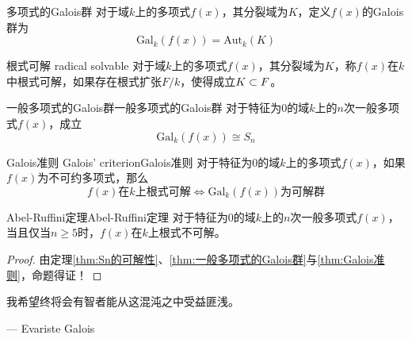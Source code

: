 \begin{definition}{多项式的Galois群}
	对于域$k$上的多项式$f(x)$，其分裂域为$K$，定义$f(x)$的Galois群为
	$$
	\text{Gal}_k(f(x))=\text{Aut}_k(K)
	$$
\end{definition}

\begin{definition}{根式可解 radical solvable}
	对于域$k$上的多项式$f(x)$，其分裂域为$K$，称$f(x)$在$k$中根式可解，如果存在根式扩张$F/k$，使得成立$K\subset F$。
\end{definition}

\begin{theorem}{一般多项式的Galois群}{一般多项式的Galois群}
	对于特征为$0$的域$k$上的$n$次一般多项式$f(x)$，成立%
	$$
	\text{Gal}_k(f(x))\cong S_n
	$$
\end{theorem}

\begin{theorem}{Galois准则 Galois' criterion}{Galois准则}
	对于特征为$0$的域$k$上的多项式$f(x)$，如果$f(x)$为不可约多项式，那么
	$$
	f(x)\text{在}k\text{上根式可解}\iff
	\text{Gal}_k(f(x))\text{为可解群}
	$$
\end{theorem}

\begin{theorem}{Abel-Ruffini定理}{Abel-Ruffini定理}
	对于特征为$0$的域$k$上的$n$次一般多项式$f(x)$，当且仅当$n\ge 5$时，$f(x)$在$k$上根式不可解。
\end{theorem}

\begin{proof}
	由定理\ref{thm:Sn的可解性}、\ref{thm:一般多项式的Galois群}与\ref{thm:Galois准则}，命题得证！
\end{proof}

\vspace{2.1cm}

\begin{center}
	{\large\kaishu 我希望终将会有智者能从这混沌之中受益匪浅。}
\end{center}

\begin{flushright}
	--- {\large{} Evariste Galois}
\end{flushright}

% 
